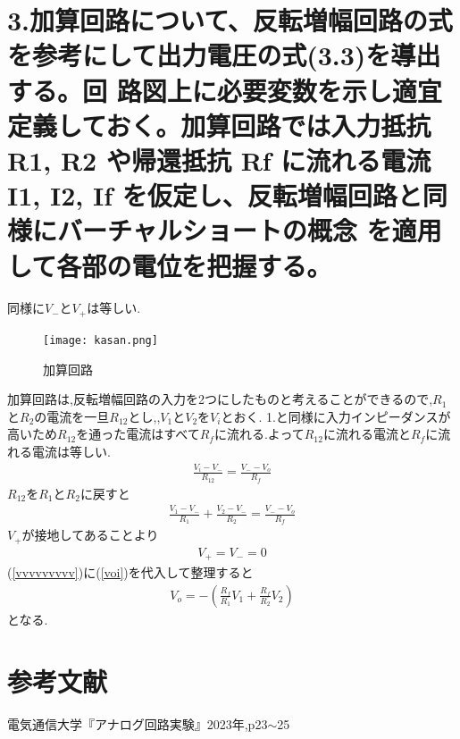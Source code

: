 \documentclass[a4j,10pt,dvipdfmx]{jarticle}
\begin{document}
\section{3.加算回路について、反転増幅回路の式を参考にして出力電圧の式(3.3)を導出する。回
路図上に必要変数を示し適宜定義しておく。加算回路では入力抵抗R1, R2 や帰還抵抗
Rf に流れる電流I1, I2, If を仮定し、反転増幅回路と同様にバーチャルショートの概念
を適用して各部の電位を把握する。 }
同様に$V_-$と$V_+$は等しい.
\begin{figure}[H]
  \begin{center}
  \texttt{[image: kasan.png]}
  \caption{加算回路}
\end{center}
\end{figure}
加算回路は,反転増幅回路の入力を2つにしたものと考えることができるので,$R_1$と$R_2$の電流を一旦$R_{12}$とし,,$V_1$と$V_2$を$V_i$とおく.
1.と同様に入力インピーダンスが高いため$R_{12}$を通った電流はすべて$R_f$に流れる.よって$R_{12}$に流れる電流と$R_f$に流れる電流は等しい.
\begin{eqnarray}
  \label{vvvvvvvv}
\frac{{V_i}-{V_-}}{R_{12}} =  \frac{{V_-}-{V_o}}{R_f} 
\end{eqnarray}
$R_{12}$を$R_1$と$R_2$に戻すと
  \begin{eqnarray}
    \label{vvvvvvvvv}
  \frac{{V_1}-{V_-}}{R_1} + \frac{{V_2}-{V_-}}{R_2} =  \frac{{V_-}-{V_o}}{R_f} 
  \end{eqnarray}
  $V_+$が接地してあることより
  \begin{eqnarray}
    \label{voi}
  V_+ = V_- = 0
  \end{eqnarray}
(\ref{vvvvvvvvv})に(\ref{voi})を代入して整理すると
\begin{eqnarray}
  \label{voqi}
V_o = -(\frac{R_f}{R_1}V_1+\frac{R_f}{R_2}V_2)
\end{eqnarray}
となる.
\section{参考文献}
\begin{thebibliography}{9}
   電気通信大学『アナログ回路実験』2023年,p23$\sim$25
\end{thebibliography}
\end{document}
